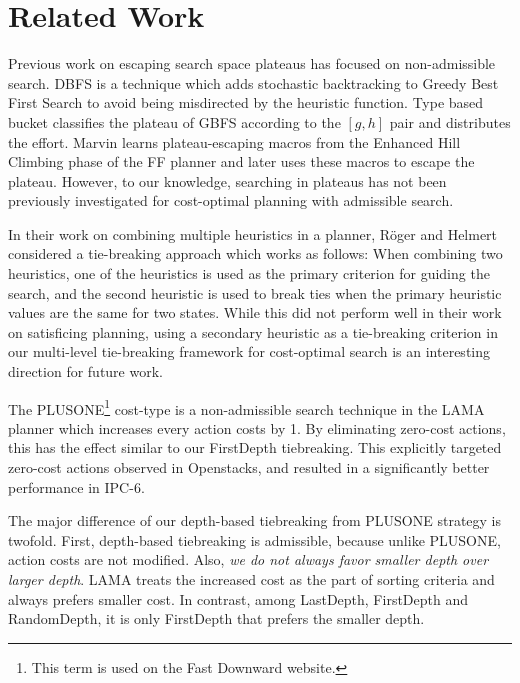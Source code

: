 \section{Related Work}
\label{sec-4}

Previous work on escaping search space plateaus has focused on
non-admissible search.  DBFS \cite{imai2011novel} is a technique which
adds stochastic backtracking to Greedy Best First Search to avoid
being misdirected by the heuristic function. Type based bucket
\cite{xie14type} classifies the plateau of GBFS according to the
$[g,h]$ pair and distributes the effort.  Marvin \cite{Coles07} learns plateau-escaping macros
from the Enhanced Hill Climbing phase of the FF planner
\cite{Hoffmann01} and later uses these macros to escape the plateau.
However, to our knowledge, searching in plateaus has not been
previously investigated for cost-optimal planning with admissible
search.

In their work on combining multiple heuristics in a planner, R\"{o}ger
and Helmert  considered a tie-breaking approach which works as follows:
When combining two heuristics, one of the
heuristics is used as the primary criterion for guiding the search,
and the second heuristic is used to break ties when the primary
heuristic values are the same for two states.
While this did not perform well in their work on satisficing planning, 
using a secondary heuristic as a tie-breaking criterion in our multi-level tie-breaking framework 
for cost-optimal search is an interesting direction for future work.

The PLUSONE\footnote{This term is used on the Fast Downward website.}
cost-type is a non-admissible search technique in the LAMA planner
\cite{richter2010lama} which increases every action costs by 1.
By eliminating zero-cost actions, this has the effect similar to our
FirstDepth tiebreaking.
This explicitly targeted zero-cost actions observed in Openstacks,
and resulted in a significantly better performance in IPC-6.

The major difference of our depth-based tiebreaking from PLUSONE
strategy is twofold.  First, depth-based tiebreaking is admissible,
because unlike PLUSONE, action costs are not modified.  Also, \emph{we
do not always favor smaller depth over larger depth}. LAMA treats the
increased cost as the part of sorting criteria and always prefers
smaller cost. In contrast, among LastDepth,
FirstDepth and RandomDepth, it is only FirstDepth that prefers the smaller depth.

